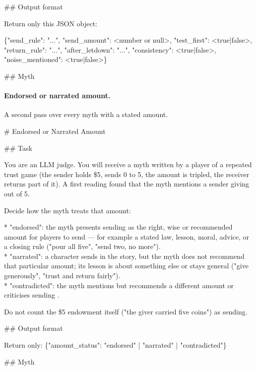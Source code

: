 \begin{promptbox}
\#\# Output format

Return only this JSON object:

\{"send\_rule": "...", "send\_amount": <number or null>, "test\_first": <true|false>, "return\_rule": "...", "after\_letdown": "...", "consistency": <true|false>, "noise\_mentioned": <true|false>\}

\#\# Myth

\end{promptbox}

\paragraph{Endorsed or narrated amount.} A second pass over every myth with a stated amount.
\begin{promptbox}
\# Endorsed or Narrated Amount

\#\# Task

You are an LLM judge. You will receive a myth written by a player of a repeated trust game (the sender holds \$5, sends 0 to 5, the amount is tripled, the receiver returns part of it). A first reading found that the myth mentions a sender giving  out of 5.

Decide how the myth treats that amount:

* "endorsed": the myth presents sending  as the right, wise or recommended amount for players to send — for example a stated law, lesson, moral, advice, or a closing rule ("pour all five", "send two, no more").\\
* "narrated": a character sends  in the story, but the myth does not recommend that particular amount; its lesson is about something else or stays general ("give generously", "trust and return fairly").\\
* "contradicted": the myth mentions  but recommends a different amount or criticises sending .

Do not count the \$5 endowment itself ("the giver carried five coins") as sending.

\#\# Output format

Return only: \{"amount\_status": "endorsed" | "narrated" | "contradicted"\}

\#\# Myth

\end{promptbox}

